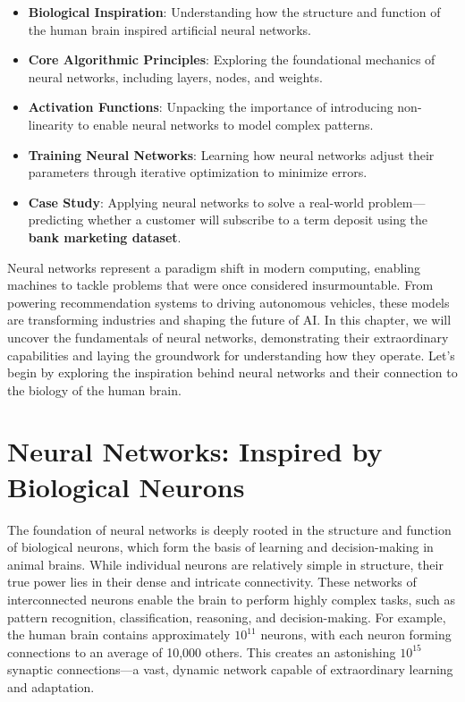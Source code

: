 \documentclass[
]{book}
\providecommand{\tightlist}{%
  \setlength{\itemsep}{0pt}\setlength{\parskip}{0pt}}
\theoremstyle{definition}
\theoremstyle{definition}
\theoremstyle{definition}
\theoremstyle{definition}
\theoremstyle{remark}
\begin{document}
\begin{itemize}
\tightlist
\item
  \textbf{Biological Inspiration}: Understanding how the structure and function of the human brain inspired artificial neural networks.\\
\item
  \textbf{Core Algorithmic Principles}: Exploring the foundational mechanics of neural networks, including layers, nodes, and weights.\\
\item
  \textbf{Activation Functions}: Unpacking the importance of introducing non-linearity to enable neural networks to model complex patterns.\\
\item
  \textbf{Training Neural Networks}: Learning how neural networks adjust their parameters through iterative optimization to minimize errors.\\
\item
  \textbf{Case Study}: Applying neural networks to solve a real-world problem---predicting whether a customer will subscribe to a term deposit using the \textbf{bank marketing dataset}.
\end{itemize}

Neural networks represent a paradigm shift in modern computing, enabling machines to tackle problems that were once considered insurmountable. From powering recommendation systems to driving autonomous vehicles, these models are transforming industries and shaping the future of AI. In this chapter, we will uncover the fundamentals of neural networks, demonstrating their extraordinary capabilities and laying the groundwork for understanding how they operate. Let's begin by exploring the inspiration behind neural networks and their connection to the biology of the human brain.

\section{Neural Networks: Inspired by Biological Neurons}\label{neural-networks-inspired-by-biological-neurons}

The foundation of neural networks is deeply rooted in the structure and function of biological neurons, which form the basis of learning and decision-making in animal brains. While individual neurons are relatively simple in structure, their true power lies in their dense and intricate connectivity. These networks of interconnected neurons enable the brain to perform highly complex tasks, such as pattern recognition, classification, reasoning, and decision-making. For example, the human brain contains approximately \(10^{11}\) neurons, with each neuron forming connections to an average of 10,000 others. This creates an astonishing \(10^{15}\) synaptic connections---a vast, dynamic network capable of extraordinary learning and adaptation.
\end{document}
